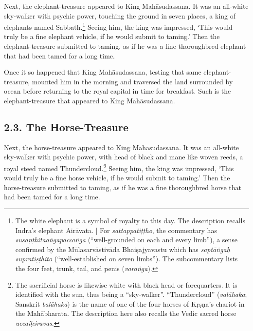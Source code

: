 \documentclass[12pt,openany]{book}%
\begin{document}
Next, the elephant-treasure appeared to King \textsanskrit{Mahāsudassana}. It was an all-white sky-walker with psychic power, touching the ground in seven places, a king of elephants named Sabbath.\footnote{The white elephant is a symbol of royalty to this day. The description recalls Indra’s elephant \textsanskrit{Airāvata}. | For \textit{\textsanskrit{sattappatiṭṭho}}, the commentary has \textit{\textsanskrit{susaṇṭhitaaṅgapaccaṅga}} (“well-grounded on each and every limb”), a sense confirmed by the \textsanskrit{Mūlasarvāstivāda} \textsanskrit{Bhaiṣajyavastu} which has \textit{\textsanskrit{saptāṅgaḥ} \textsanskrit{supratiṣṭhito}} (“well-established on seven limbs”). The subcommentary lists the four feet, trunk, tail, and penis (\textit{\textsanskrit{varaṅga}}). } Seeing him, the king was impressed, ‘This would truly be a fine elephant vehicle, if he would submit to taming.’ Then the elephant-treasure submitted to taming, as if he was a fine thoroughbred elephant that had been tamed for a long time. 

Once it so happened that King \textsanskrit{Mahāsudassana}, testing that same elephant-treasure, mounted him in the morning and traversed the land surrounded by ocean before returning to the royal capital in time for breakfast. Such is the elephant-treasure that appeared to King \textsanskrit{Mahāsudassana}. 

\subsection*{2.3. The Horse-Treasure }

Next, the horse-treasure appeared to King \textsanskrit{Mahāsudassana}. It was an all-white sky-walker with psychic power, with head of black and mane like woven reeds, a royal steed named Thundercloud.\footnote{The sacrificial horse is likewise white with black head or forequarters. It is identified with the sun, thus being a “sky-walker”. “Thundercloud” (\textit{\textsanskrit{valāhaka}}; Sanskrit \textit{\textsanskrit{balāhaka}}) is the name of one of the four horses of \textsanskrit{Kṛṣṇa}’s chariot in the \textsanskrit{Mahābharata}. The description here also recalls the Vedic sacred horse \textit{\textsanskrit{uccaiḥśravas}}. } Seeing him, the king was impressed, ‘This would truly be a fine horse vehicle, if he would submit to taming.’ Then the horse-treasure submitted to taming, as if he was a fine thoroughbred horse that had been tamed for a long time. 
\end{document}
